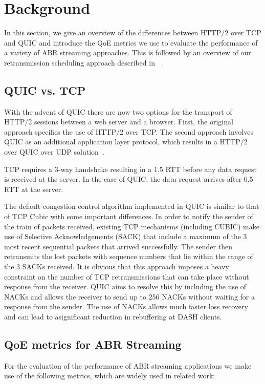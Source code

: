 \section{Background}
\label{sec:background}
In this section, we give an overview of the differences between HTTP/2 over TCP and QUIC and introduce the QoE metrics we use to evaluate the performance of a variety of ABR streaming approaches. This is followed by an overview of our retransmission scheduling approach described in ~\cite{Wang:TOMM:2017}.

\subsection{QUIC vs. TCP}
\label{subsubsec:quicvstcp}
With the advent of QUIC there are now two options for the transport of HTTP/2 sessions between a web server and a browser. First, the original approach specifies the use of HTTP/2 over TCP. The second approach involves QUIC as an additional application layer protocol, which results in a HTTP/2 over QUIC over UDP solution~\cite{quic_chromium}.

TCP requires a 3-way handshake resulting in a 1.5 RTT before any data request is received at the server. In the case of QUIC, the data request arrives after 0.5 RTT at the server.

The default congestion control algorithm implemented in QUIC is similar to that of TCP Cubic \cite{ha2008cubic} with some important differences.
In order to notify the sender of the train of packets received, existing TCP mechanisms (including CUBIC) make use of Selective Acknowledgements (SACK) that include a maximum of the 3 most recent sequential packets that arrived successfully. The sender then retransmits the lost packets with sequence numbers that lie within the range of the 3 SACKs received. It is obvious that this approach imposes a heavy constraint on the number of TCP retransmissions that can take place without response from the receiver. QUIC aims to resolve this by including the use of NACKs and allows the receiver to send up to 256 NACKs without waiting for a response from the sender. The use of NACKs allows much faster loss recovery and can lead to asignificant reduction in rebuffering at DASH clients.

\subsection{QoE metrics for ABR Streaming}
For the evaluation of the performance of ABR streaming applications we make use of the following metrics, which are widely used in related work:

